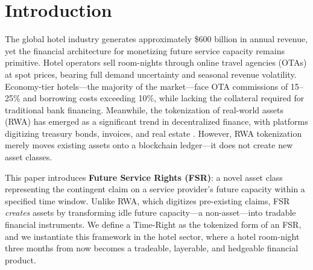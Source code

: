 \documentclass[12pt,a4paper]{article}
\begin{document}
\begin{abstract}
A unified money-flow analysis reveals that Time-Rights generate ,227 of net system value per token, with hotels earning 56\% more annual revenue than OTA distribution (\yen 35.2M vs.\ \yen 22.6M per hotel-year) driven by the over-issuance multiplier ($\omega=1.29\times$) and occupancy-independent revenue certainty. Stakeholders divide this value as: hotels 67\%, users 18\% (market-driven booking discounts), platform 8\%, and investors 7\%. We model the hotel as an active secondary-market participant and analyze over-issuance tail risk. Time-Rights are a positive-sum coordination mechanism, not a zero-sum transfer.
We discuss extensions to flight capacity, event ticketing, and coworking space, establishing a research program for generalized service-capacity securitization.

\bigskip
\noindent\textbf{Keywords:} Future Service Rights, Time-Right, Asset-Backed Securities, Tokenization, Real-World Assets, Merton Model, Gaussian Copula, Mechanism Design, Hotel Finance

\noindent\textbf{JEL Classification:} G12, G23, G32, L83
\end{abstract}

\newpage

\section{Introduction}

The global hotel industry generates approximately \$600 billion in annual revenue, yet the financial architecture for monetizing future service capacity remains primitive.
Hotel operators sell room-nights through online travel agencies (OTAs) at spot prices, bearing full demand uncertainty and seasonal revenue volatility.
Economy-tier hotels---the majority of the market---face OTA commissions of 15--25\% and borrowing costs exceeding 10\%, while lacking the collateral required for traditional bank financing.
Meanwhile, the tokenization of real-world assets (RWA) has emerged as a significant trend in decentralized finance, with platforms digitizing treasury bonds, invoices, and real estate \cite{chen2023rwa}.
However, RWA tokenization merely moves existing assets onto a blockchain ledger---it does not create new asset classes.

This paper introduces \textbf{Future Service Rights (FSR)}: a novel asset class representing the contingent claim on a service provider's future capacity within a specified time window.
Unlike RWA, which digitizes pre-existing claims, FSR \emph{creates} assets by transforming idle future capacity---a non-asset---into tradable financial instruments.
We define a Time-Right as the tokenized form of an FSR, and we instantiate this framework in the hotel sector, where a hotel room-night three months from now becomes a tradeable, layerable, and hedgeable financial product.
\end{document}
